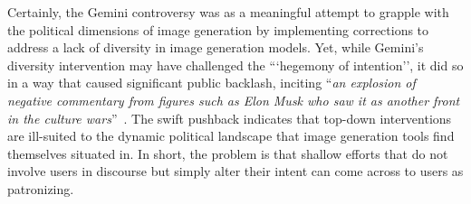 Certainly, the Gemini controversy was as a meaningful attempt to grapple with the political dimensions of image generation by implementing corrections to address a lack of diversity in image generation models. 
Yet, while Gemini's diversity intervention may have challenged the ```hegemony of intention'', it did so in a way that caused significant public backlash, inciting ``\textit{an explosion of negative commentary from figures such as Elon Musk who saw it as another front in the culture wars}''~\cite{milmoandkern2024gemini}. 
The swift pushback indicates that top-down interventions are ill-suited to the dynamic political landscape that image generation tools find themselves situated in.
In short, the problem is that shallow efforts that do not involve users in discourse but simply alter their intent can come across to users as patronizing. 


